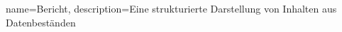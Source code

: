 
{
    name=Bericht,
    description={Eine strukturierte Darstellung von Inhalten aus Datenbeständen}
}